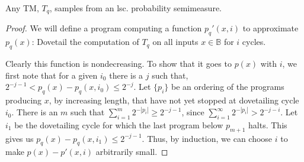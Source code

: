 \begin{theorem}
Any TM, $T_q$, samples from an lsc. probability semimeasure.\label{theorem:back}
\end{theorem}
\begin{proof}
We will define a program computing a function $p_q'(x, i)$ to approximate $p_q(x)$: Dovetail the computation of $T_q$ on all inputs $x \in \mathbb B$ for $i$ cycles.

Clearly this function is nondecreasing. To show that it goes to $p(x)$ with $i$, we first note that for a given $i_0$ there is a $j$ such that, $2^{-j-1} < p_q(x) - p_q(x, i_0) \leq 2^{-j}$. Let $\{p_i\}$ be an ordering of the programs producing $x$, by increasing length, that have not yet stopped at dovetailing cycle $i_0$. There is an $m$ such that $\sum_{i=1}^m 2^{-|p_i|} \geq 2^{-j-1}$, since $\sum_{i=1}^{\infty}2^{-|p_i|} > 2^{-j-i}$. Let $i_1$ be the dovetailing cycle for which the last program below $p_{m+1}$ halts. This gives us $p_q(x) - p_q(x, i_1) \leq 2^{-j-1}$. Thus, by induction, we can choose $i$ to make $p(x) - p'(x, i)$ arbitrarily small. 
\end{proof}

